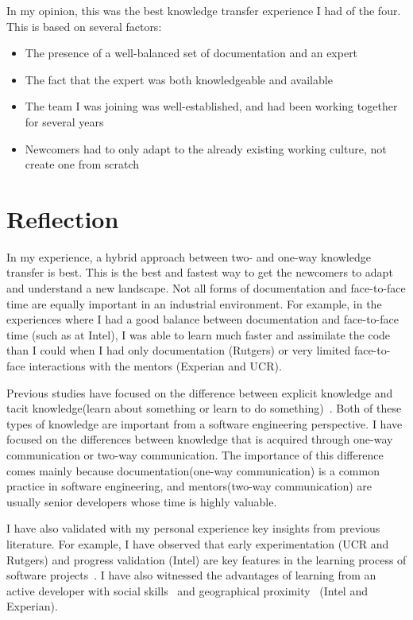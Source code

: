 \documentclass[12pt, letterpaper]{article}
\begin{document}
In my opinion, this was the best knowledge transfer experience I had of the four. This is based on
several factors:
\begin{itemize}
  \item The presence of a well-balanced set of documentation and an expert
  \item The fact that the expert was both knowledgeable and available
  \item The team I was joining was well-established, and had been working together for several years
  \item Newcomers had to only adapt to the already existing working culture, not create one from scratch
\end{itemize}

\section{Reflection}

In my experience, a hybrid approach between two- and one-way knowledge transfer is best.
This is the best and fastest way to get the newcomers to adapt and understand
a new landscape. Not all forms of documentation and face-to-face time
are equally important in an industrial environment. For example, in the experiences where I had a good balance between documentation and face-to-face time
(such as at Intel), I was able to learn much faster and assimilate the code than I could when
I had only documentation (Rutgers) or very limited face-to-face interactions with the mentors (Experian and 
UCR). 

Previous studies have focused on the difference between explicit knowledge and tacit knowledge(learn about 
something or learn to do something)~\cite{cook99,civi00}. Both of these types of knowledge are important from a software
engineering perspective. I have focused on the differences between knowledge that is 
acquired through one-way communication or two-way communication. The importance of this difference comes
mainly because
documentation(one-way communication) is a common practice in software engineering, 
and mentors(two-way communication) are usually senior developers 
whose time is highly valuable. 

I have also validated with my personal experience key insights from previous literature. 
For example, I have observed that early experimentation (UCR and Rutgers) and progress validation (Intel) are key features
in the learning process of software projects~\cite{Dagenais10}. I have also witnessed the advantages of 
learning from an active developer with social skills~\cite{Steinmacher12}
and geographical proximity~\cite{Whitworth06} (Intel and Experian). 
\end{document}
